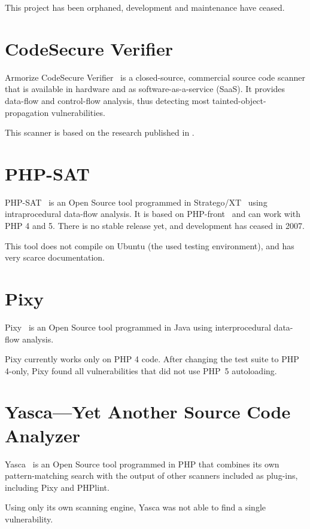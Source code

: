 This project has been orphaned, \ie development and maintenance have ceased.

\section{CodeSecure Verifier}
\label{armorize}
Armorize CodeSecure Verifier~\cite{codesecure, verifier} is a closed-source, commercial source code scanner that is available in hardware and as software-as-a-service (SaaS). It provides data-flow and control-flow analysis, thus detecting most tainted-object-propagation vulnerabilities.

This scanner is based on the research published in \cite{huang-securing}.

\section{PHP-SAT}
\label{php-sat}
PHP-SAT~\cite{php-sat} is an Open Source tool programmed in Stratego/XT~\cite{stratego} using intraprocedural data-flow analysis. It is based on PHP-front~\cite{php-front} and can work with PHP 4 and 5. There is no stable release yet, and development has ceased in 2007.

This tool does not compile on Ubuntu (the used testing environment), and has very scarce documentation.

\section{Pixy}
\label{pixy-comparison}
Pixy~\cite{pixy} is an Open Source tool programmed in Java using interprocedural data-flow analysis.

Pixy currently works only on PHP 4 code. After changing the test suite to PHP 4-only, Pixy found all vulnerabilities that did not use PHP~5 autoloading.

\section{Yasca---Yet Another Source Code Analyzer}
\label{yasca}
Yasca~\cite{yasca} is an Open Source tool programmed in PHP that combines its own pattern-matching search with the output of other scanners included as plug-ins, including Pixy and PHPlint.

Using only its own scanning engine, Yasca was not able to find a single vulnerability.


